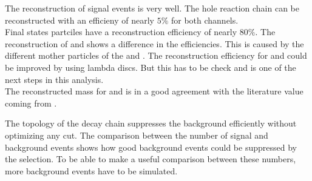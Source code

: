 The reconstruction of signal events is very well.
The hole reaction chain can be reconstructed with an efficieny of nearly $5\%$ for both channels.\\
Final states partciles have a reconstruction efficiency of nearly $80\%$.
The reconstruction of \lam and \alam shows a difference in the efficiencies.
This is caused by the different mother particles of the \lam and \alam. 
The reconstruction efficiency for \lam and \alam could be improved by using lambda discs.
But this has to be check and is one of the next steps in this analysis.\\
The reconstructed mass for \excitedcascade and \excitedanticascade is in a good agreement with the literature value coming from \cite{PDG}.

The topology of the decay chain suppresses the background efficiently without optimizing any cut.
The comparison between the number of signal and background events shows how good background events could be suppressed by the selection.
To be able to make a useful comparison between these numbers, more background events have to be simulated.
 
  


